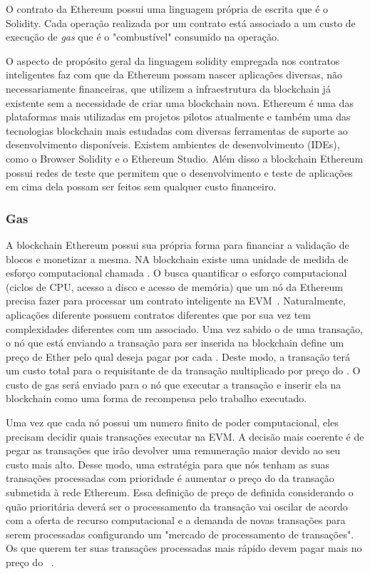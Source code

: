 \documentclass[12pt]{article}
\begin{document}
O contrato da Ethereum possui uma linguagem própria de escrita que é o Solidity. Cada operação realizada por um contrato está associado a um custo de execução de \emph{gas} que é o "combustível" consumido na operação\cite{miers2019analise}. 

O aspecto de propósito geral da linguagem solidity empregada nos contratos inteligentes faz com que da Ethereum possam nascer aplicações diversas, não necessariamente financeiras, que utilizem a infraestrutura da blockchain já existente sem a necessidade de criar uma blockchain nova. Ethereum é uma das plataformas mais utilizadas em projetos pilotos atualmente e também uma das tecnologias blockchain mais estudadas com diversas ferramentas de suporte ao desenvolvimento disponíveis. Existem ambientes de desenvolvimento (IDEs), como o Browser Solidity e o Ethereum Studio. Além disso a blockchain Ethereum possui redes de teste que permitem que o desenvolvimento e teste de aplicações em cima dela possam ser feitos sem qualquer custo financeiro.

\subsubsection{Gas}

A blockchain Ethereum possui sua própria forma para financiar a validação de blocos e monetizar a mesma. NA blockchain existe uma unidade de medida de esforço computacional chamada . O  busca quantificar o esforço computacional (ciclos de CPU, acesso a disco e acesso de memória) que um nó da Ethereum precisa fazer para processar um contrato inteligente na EVM~\cite{eric2019gas}. Naturalmente, aplicações diferente possuem contratos diferentes que por sua vez tem complexidades diferentes com um  associado. Uma vez sabido o  de uma transação, o nó que está enviando a transação para ser inserida na blockchain define um preço de Ether pelo qual deseja pagar por cada . Deste modo, a transação terá um custo total para o requisitante de  da transação multiplicado por preço do . O custo de gas será enviado para o nó que executar a transação e inserir ela na blockchain como uma forma de recompensa pelo trabalho executado.

Uma vez que cada nó possui um numero finito de poder computacional, eles precisam decidir quais transações executar na EVM. A decisão mais coerente é de pegar as transações que irão devolver uma remuneração maior devido ao seu custo mais alto. Desse modo, uma estratégia para que nós tenham as suas transações processadas com prioridade é aumentar o preço do  da transação submetida à rede Ethereum. Essa definição de preço de  definida considerando o quão prioritária deverá ser o processamento da transação vai oscilar de acordo com a oferta de recurso computacional e a demanda de novas transações para serem processadas configurando um "mercado de processamento de transações". Os que querem ter suas transações processadas mais rápido devem pagar mais no preço do ~\cite{eric2019gas}.
\end{document}
